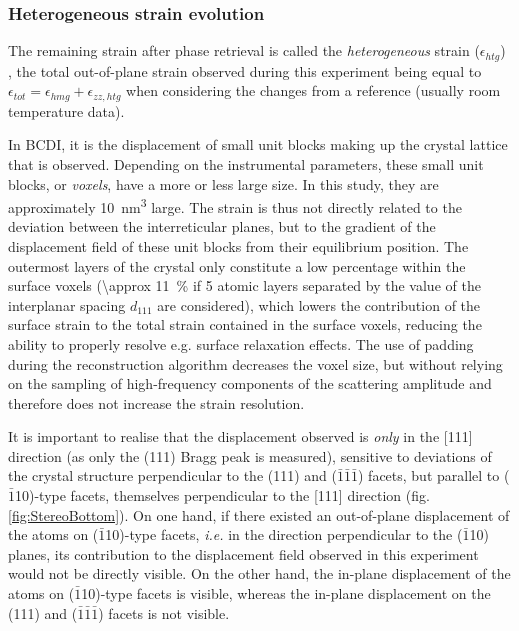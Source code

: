 {\subsubsection{Heterogeneous strain evolution}

The remaining strain after phase retrieval is called the \textit{heterogeneous} strain ($\epsilon_{htg}$) \parencite{Grediac1996, Favier2007, Atlan2023}, the total out-of-plane strain observed during this experiment being equal to $\epsilon_{tot} = \epsilon_{hmg} + \epsilon_{zz, htg}$ when considering the changes from a reference (usually room temperature data).

In BCDI, it is the displacement of small unit blocks making up the crystal lattice that is observed.
Depending on the instrumental parameters, these small unit blocks, or \textit{voxels}, have a more or less large size.
In this study, they are approximately \qty{10}{\nm^3} large.
The strain is thus not directly related to the deviation between the interreticular planes, but to the gradient of the displacement field of these unit blocks from their equilibrium position.
The outermost layers of the crystal only constitute a low percentage within the surface voxels (\qty{\approx 11}{\percent} if 5 atomic layers separated by the value of the interplanar spacing $d_{111}$ are considered), which lowers the contribution of the surface strain to the total strain contained in the surface voxels, reducing the ability to properly resolve e.g. surface relaxation effects.
The use of padding during the reconstruction algorithm decreases the voxel size, but without relying on the sampling of high-frequency components of the scattering amplitude and therefore does not increase the strain resolution.

It is important to realise that the displacement observed is \textit{only} in the [111] direction (as only the (111) Bragg peak is measured), sensitive to deviations of the crystal structure perpendicular to the (111) and ($\bar{1}\bar{1}\bar{1}$) facets, but parallel to ($\bar{1}$10)-type facets, themselves perpendicular to the [111] direction (fig. \ref{fig:StereoBottom}).
On one hand, if there existed an out-of-plane displacement of the atoms on ($\bar{1}$10)-type facets, \textit{i.e.} in the direction perpendicular to the ($\bar{1}$10) planes, its contribution to the displacement field observed in this experiment would not be directly visible.
On the other hand, the in-plane displacement of the atoms on ($\bar{1}$10)-type facets is visible, whereas the in-plane displacement on the (111) and ($\bar{1}\bar{1}\bar{1}$) facets is not visible.

}
